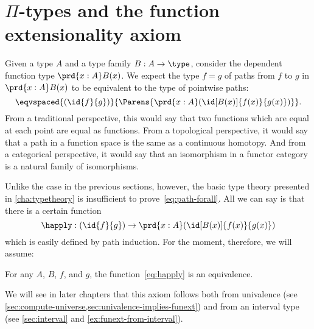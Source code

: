%

\section{\texorpdfstring{$\Pi$}{Π}-types and the function extensionality axiom}
\label{sec:compute-pi}

%
%
%
Given a type $A$ and a type family $B : A \to \type$, consider the dependent function type $\prd{x:A}B(x)$.
We expect the type $f=g$ of paths from $f$ to $g$ in $\prd{x:A} B(x)$ to be equivalent to
the type of pointwise paths:
\begin{equation}
  \eqvspaced{(\id{f}{g})}{\Parens{\prd{x:A} (\id[B(x)]{f(x)}{g(x)})}}.\label{eq:path-forall}
\end{equation}
From a traditional perspective, this would say that two functions which are equal at each point are equal as functions.
%
From a topological perspective, it would say that a path in a function space is the same as a continuous homotopy.
%
And from a categorical perspective, it would say that an isomorphism in a functor category is a natural family of isomorphisms.

Unlike the case in the previous sections, however, the basic type theory presented in \cref{cha:typetheory} is insufficient to prove~\eqref{eq:path-forall}.
All we can say is that there is a certain function
\begin{equation}\label{eq:happly}
  \happly : (\id{f}{g}) \to \prd{x:A} (\id[B(x)]{f(x)}{g(x)})
\end{equation}
which is easily defined by path induction.
For the moment, therefore, we will assume:

\begin{axiom}\label{axiom:funext}
  For any $A$, $B$, $f$, and $g$, the function~\eqref{eq:happly} is an equivalence.
\end{axiom}

We will see in later chapters that this axiom follows both from univalence (see \cref{sec:compute-universe,sec:univalence-implies-funext}) and from an interval type (see \cref{sec:interval} and \cref{ex:funext-from-interval}).

